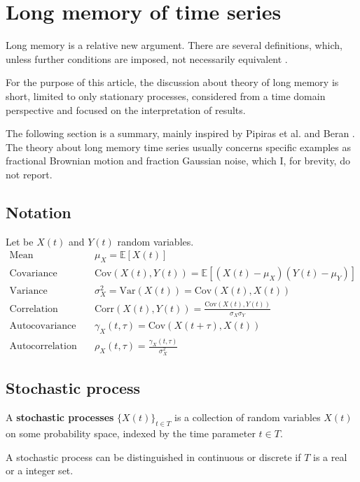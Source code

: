 \section{Long memory of time series}
Long memory is a relative new argument. There are several definitions, which, unless further conditions are imposed, not necessarily equivalent \cite{pipiras_taqqu_2017}.

For the purpose of this article, the discussion about theory of long memory is short, limited to only stationary processes, considered from a time domain perspective and focused on the interpretation of results.

The following section is a summary, mainly inspired by Pipiras et al. \cite{pipiras_taqqu_2017} and Beran \cite{Beran:2304008}. The theory about long memory time series usually concerns specific examples as fractional Brownian motion and fraction Gaussian noise, which I, for brevity, do not report.

\subsection{Notation}
Let be $X(t)$ and $Y(t)$ random variables.
\begin{align}
\text{Mean}\quad &\mu_X = \mathbb{E}[X(t)] \\
\text{Covariance}\quad &\text{Cov}(X(t), Y(t)) = \mathbb{E}[(X(t) - \mu_X)(Y(t) - \mu_Y)] \\
\text{Variance}\quad &\sigma^2_X = \text{Var}(X(t)) = \text{Cov}(X(t), X(t)) \\
\text{Correlation}\quad &\text{Corr}(X(t), Y(t)) = \frac{\text{Cov}(X(t), Y(t))}{\sigma_X  \sigma_Y } \\
\text{Autocovariance}\quad &\gamma_X(t, \tau) = \text{Cov}(X(t+\tau), X(t)) \\
\text{Autocorrelation}\quad &\rho_X(t, \tau) = \frac{\gamma_X(t, \tau)}{\sigma^2_X}
\end{align}

\subsection{Stochastic process}
\begin{definition}
	A \textbf{stochastic processes} $\{X(t)\}_{t \in T}$ is a collection of random variables $X(t)$ on some probability space, indexed by the time parameter $t \in T$.
\end{definition}

A stochastic process can be distinguished in continuous or discrete if $T$ is a real or a integer set.


